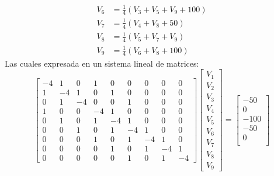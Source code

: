 \documentclass[
  11pt,
  letterpaper,
   addpoints,
   answers
  ]{exam}
\begin{document}
\begin{questions}
\begin{solution}
\begin{enumerate}
\begin{align}
                V_6 &= \frac{1}{4} \left(V_3 + V_5 + V_9 + 100\right) \\
                V_7 &= \frac{1}{4} \left(V_4 + V_8 + 50\right) \\
                V_8 &= \frac{1}{4} \left(V_5 + V_7 + V_9\right) \\
                V_9 &= \frac{1}{4} \left(V_6 + V_8 + 100\right)
                \end{align}
            Las cuales expresada en un sistema lineal de matrices:
            \begin{equation}
                \begin{bmatrix}
                -4 & 1 & 0 & 1 & 0 & 0 & 0 & 0 & 0 \\
                1 & -4 & 1 & 0 & 1 & 0 & 0 & 0 & 0 \\
                0 & 1 & -4 & 0 & 0 & 1 & 0 & 0 & 0 \\
                1 & 0 & 0 & -4 & 1 & 0 & 0 & 0 & 0 \\
                0 & 1 & 0 & 1 & -4 & 1 & 0 & 0 & 0 \\
                0 & 0 & 1 & 0 & 1 & -4 & 1 & 0 & 0 \\
                0 & 0 & 0 & 1 & 0 & 1 & -4 & 1 & 0 \\
                0 & 0 & 0 & 0 & 1 & 0 & 1 & -4 & 1 \\
                0 & 0 & 0 & 0 & 0 & 1 & 0 & 1 & -4
                \end{bmatrix}
                \begin{bmatrix}
                V_1 \\
                V_2 \\
                V_3 \\
                V_4 \\
                V_5 \\
                V_6 \\
                V_7 \\
                V_8 \\
                V_9
                \end{bmatrix}
                =
                \begin{bmatrix}
                -50 \\
                0 \\
                -100 \\
                -50 \\
                0 \\

\end{bmatrix}
\end{equation}
\end{enumerate}
\end{solution}
\end{questions}
\end{document}
